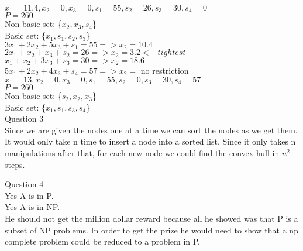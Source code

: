 \documentclass{article}
\begin{document}
${      x_1 = 11.4, x_2 = 0, x_3 = 0, s_1 = 55, s_2 = 26, s_3 = 30, s_4 = 0}$\\
${P = 260}$\\
Non-basic set: \{${x_2, x_3, s_4}$\}\\
Basic set: \{${x_1, s_1, s_2, s_3}$\}\\

${     3x_1 +  2x_2 +  5x_3 + s_1 = 55 => x_2=10.4}$\\
${     2x_1 +   x_2 +   x_3 + s_2 = 26 => x_2=3.2 <- tightest}$\\
${      x_1 +   x_2 +  3x_3 + s_3 = 30 => x_2=18.6}$\\
${     5x_1 +  2x_2 +  4x_3 + s_4 = 57 => x_2=}$ no restriction\\

${      x_1 = 13, x_2 = 0, x_3 = 0, s_1 = 55, s_2 = 0, s_3 = 30, s_4 = 57}$\\
${P = 260}$\\
Non-basic set: \{${s_2, x_2, x_3}$\}\\
Basic set: \{${x_1, s_1, s_3, s_4}$\}\\


Question 3\\
Since we are given the nodes one at a time we can sort the nodes as we get them. 
It would only take n time to insert a node into a sorted list.
Since it only takes n manipulations after that, for each new node we could find the convex hull in ${n^2}$ steps.

Question 4\\
Yes A is in P.\\
Yes A is in NP.\\
He should not get the million dollar reward because all he showed was that P is a subset of NP problems.
In order to get the prize he would need to show that a np complete problem could be reduced to a problem in P.\\
\end{document}
